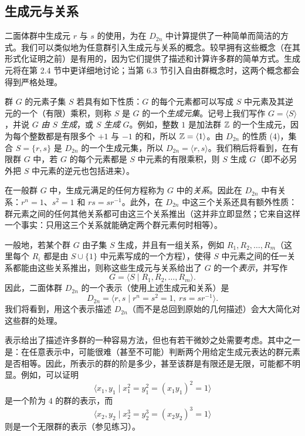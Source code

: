 \subsection*{生成元与关系}

二面体群中生成元 $r$ 与 $s$ 的使用，为在 $D_{2n}$ 中计算提供了一种简单而简洁的方式。我们可以类似地为任意群引入生成元与关系的概念。较早拥有这些概念（在其形式化证明之前）是有用的，因为它们提供了描述和计算许多群的简单方式。生成元将在第 2.4 节中更详细地讨论；当第 6.3 节引入自由群概念时，这两个概念都会得到严格处理。

群 $G$ 的元素子集 $S$ 若具有如下性质：$G$ 的每个元素都可以写成 $S$ 中元素及其逆元的一个（有限）乘积，则称 $S$ 是 $G$ 的一个\emph{生成元集}。记号上我们写作 $G=\langle S\rangle$，并说 $G$ \emph{由 $S$ 生成}，或 $S$ \emph{生成} $G$。例如，整数 $1$ 是加法群 $\mathbb{Z}$ 的一个生成元，因为每个整数都是有限多个 $+1$ 与 $-1$ 的和，所以 $\mathbb{Z}=\langle 1\rangle$。由 $D_{2n}$ 的性质 (4)，集合 $S=\{r,s\}$ 是 $D_{2n}$ 的一个生成元集，所以 $D_{2n}=\langle r,s\rangle$。我们稍后将看到，在有限群 $G$ 中，若 $G$ 的每个元素都是 $S$ 中元素的有限乘积，则 $S$ 生成 $G$（即不必另外把 $S$ 中元素的逆元也包括进来）。

在一般群 $G$ 中，生成元满足的任何方程称为 $G$ 中的\emph{关系}。因此在 $D_{2n}$ 中有关系：$r^n=1$、$s^2=1$ 和 $rs=sr^{-1}$。此外，在 $D_{2n}$ 中这三个关系还具有额外性质：群元素之间的任何其他关系都可由这三个关系推出（这并非立即显然；它来自这样一个事实：只用这三个关系就能确定两个群元素何时相等）。

一般地，若某个群 $G$ 由子集 $S$ 生成，并且有一组关系，例如 $R_1,R_2,\ldots,R_m$（这里每个 $R_i$ 都是由 $S\cup\{1\}$ 中元素写成的一个方程），使得 $S$ 中元素之间的任一关系都能由这些关系推出，则称这些生成元与关系给出了 $G$ 的一个\emph{表示}，并写作
\[
  G=\langle S\mid R_1,R_2,\ldots,R_m\rangle.
\]
因此，二面体群 $D_{2n}$ 的一个表示（使用上述生成元和关系）是
\begin{equation}
  D_{2n}=\langle r,s\mid r^n=s^2=1,\ rs=sr^{-1}\rangle. \tag{1.1}
\end{equation}
我们将看到，用这个表示描述 $D_{2n}$（而不是总回到原始的几何描述）会大大简化对这些群的处理。

表示给出了描述许多群的一种容易方法，但也有若干微妙之处需要考虑。其中之一是：在任意表示中，可能很难（甚至不可能）判断两个用给定生成元表达的群元素是否相等。因此，所表示的群的阶是多少，甚至该群是有限还是无限，可能都不明显。例如，可以证明
\[
  \langle x_1,y_1\mid x_1^2=y_1^2=(x_1y_1)^2=1\rangle
\]
是一个阶为 $4$ 的群的表示，而
\[
  \langle x_2,y_2\mid x_2^3=y_2^3=(x_2y_2)^3=1\rangle
\]
则是一个无限群的表示（参见练习）。

